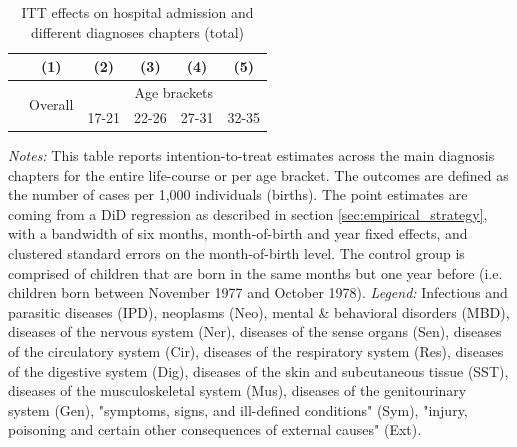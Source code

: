 \documentclass[11pt, a4paper,draft]{article} %
\begin{document}
\begin{table}[H] \centering 
\begin{threeparttable} \centering \caption{ITT effects on hospital admission and different diagnoses chapters (total)}\label{tab: ITT_across_chapters_per_age_group_total}
 {\def\sym#1{\ifmmode^{#1}\else\(^{#1}\)\fi} 
	\begin{tabular}{l*{5}{c}}
		\toprule 
		&\multicolumn{1}{c}{(1)}&\multicolumn{1}{c}{(2)}&\multicolumn{1}{c}{(3)}&\multicolumn{1}{c}{(4)}&\multicolumn{1}{c}{(5)}\\
		\midrule
		&\multirow{2}{*}{Overall} & \multicolumn{4}{c}{Age brackets} \\ 
		\cmidrule(lr){3-6}
		&&\multicolumn{1}{c}{17-21}&\multicolumn{1}{c}{22-26}&\multicolumn{1}{c}{27-31}&\multicolumn{1}{c}{32-35}\\
		
		\midrule

		

		\bottomrule 
	\end{tabular}}
	\end{threeparttable} 
	\begin{minipage}{0.9\linewidth}
	\scriptsize \emph{Notes:} This table reports intention-to-treat estimates across the main diagnosis chapters for the entire life-course or per age bracket. The outcomes are defined as the number of cases per 1,000 individuals (births). The point estimates are coming from a DiD regression as described in section \ref{sec:empirical_strategy}, with a bandwidth of six months, month-of-birth and year fixed effects, and clustered standard errors on the month-of-birth level. The control group is comprised of children that are born in the same months but one year before (i.e. children born between November 1977 and October 1978).\newline
	\emph{Legend:} Infectious and parasitic diseases (IPD), neoplasms (Neo), mental \& behavioral disorders (MBD), diseases of the nervous system (Ner), diseases of the sense organs (Sen), diseases of the circulatory system (Cir), diseases of the respiratory system (Res), diseases of the digestive system (Dig), diseases of the skin and subcutaneous tissue (SST), diseases of the musculoskeletal system (Mus), diseases of the genitourinary system (Gen), "symptoms, signs, and ill-defined conditions" (Sym), "injury, poisoning and certain other consequences of external causes" (Ext).
	\end{minipage}
\end{table} 
\end{document}

